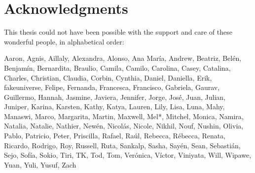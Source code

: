 % 

\cleardoublepage

\section*{Acknowledgments}

This thesis could not have been possible with the support and care of these wonderful people, in alphabetical order:

Aaron, Agnis, Aillaly, Alexandra, Alonso, Ana María, Andrew, Beatriz, Belén, Benjamín, Bernardita, Braulio, Camila, Camilo, Carolina, Casey, Catalina, Charles, Christian, Claudia, Corbin, Cynthia, Daniel, Daniella, Erik, fakeuniverse, Felipe, Fernanda, Francesca, Francisco, Gabriela, Gaurav, Guillermo, Hannah, Jasmine, Javiera, Jennifer, Jorge, José, Juan, Julian, Juniper, Karina, Karsten, Kathy, Katya, Lauren, Lily, Lisa, Luna, Mahy, Manaswi, Marco, Margarita, Martin, Maxwell, Mel*, Mitchel, Monica, Namira, Natalia, Natalie, Nathier, Newén, Nicolás, Nicole, Nikhil, Nouf, Nushin, Olivia, Pablo, Patricio, Peter, Priscilla, Rafael, Raúl, Rebecca, Rébecca, Renata, Ricardo, Rodrigo, Roy, Russell, Ruta, Sankalp, Sasha, Sayén, Sean, Sebastián, Sejo, Sofía, Sokio, Tiri, TK, Tod, Tom, Verónica, Víctor, Viniyata, Will, Wipawe, Yuan, Yuli, Yusuf, Zach

